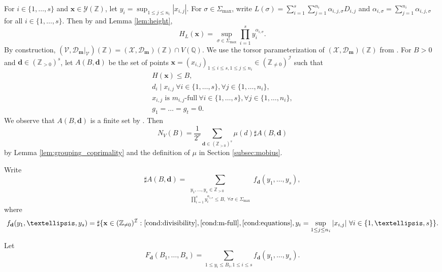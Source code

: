 \documentclass[10pt, a4paper, reqno, english]{amsart}
\newcommand\ZZ{\mathbb{Z}}
\newcommand\QQ{\mathbb{Q}}
\newcommand{\indexset}{{\mathcal I}} %
\theoremstyle{definition}
\numberwithin{theorem}{section}
\numberwithin{equation}{section}
\begin{document}
For $i\in\{1,\dots,s\}$ and $\mathbf x\in \mathscr Y(\ZZ)$, let $y_i=\sup_{1\leq j\leq n_{i}}|x_{i,j}|$. For $\sigma\in\Sigma_{\max}$, write $L(\sigma)=\sum_{i=1}^s\sum_{j=1}^{n_i}\alpha_{i,j,\sigma}D_{i,j}$ and $\alpha_{i,\sigma}=\sum_{j=1}^{n_i}\alpha_{i,j,\sigma}$ for all $i\in\{1,\dots,s\}$.
Then by \cite[Proposition 6.10]{hypmethod} and Lemma \ref{lem:height},
$$H_L(\mathbf x)=\sup_{\sigma\in \Sigma_{\max}}\prod_{i=1}^s y_i^{\alpha_{i,\sigma}}.$$
By construction, $\left(\mathscr V,\mathscr D_{\mathbf m}|_{\mathscr V}\right)(\ZZ)=\left(\mathscr X,\mathscr D_{\mathbf m}\right)(\ZZ)\cap V(\QQ)$. We use the torsor parameterization of $\left(\mathscr X,\mathscr D_{\mathbf m}\right)(\ZZ)$ from \cite[\S6.4]{hypmethod}.
For $B>0$ and $\mathbf d\in(\ZZ_{>0})^{s}$, 
	let $A(B,\mathbf d)$ be the set of points
	$\mathbf x=(x_{i,j})_{1\leq i\leq s,1\leq j\leq n_i}\in(\ZZ_{\neq0})^{\indexset}$ such that 
	\begin{gather}
	H(\mathbf x)\leq B, \label{cond:height}\\
	d_i\mid x_{i,j} \ \forall i\in\{1,\dots,s\}, \forall j\in\{1,\dots,n_i\}, \label{cond:divisibility}\\
	x_{i,j} \text{ is } m_{i,j}\text{-full} \ \forall i\in\{1,\dots,s\}, \forall j\in\{1,\dots,n_i\}, \label{cond:m-full}\\ 
	g_1=\dots=g_t=0.
	\label{cond:equations}
	\end{gather}	
	We observe that $A(B, \mathbf d)$ is a finite set by \cite[Lemma 6.11]{hypmethod}.	
	Then
	\begin{equation}
	\label{eq:moebius_inversion}
 	N_V(B)=\frac 1{2^r}\sum_{\mathbf d\in(\ZZ_{>0})^{s}}\mu(d)\sharp A(B, \mathbf d)
	\end{equation}
	by Lemma \ref{lem:grouping_coprimality} and the definition of $\mu$ in Section \ref{subsec:mobius}.

	
	Write
	$$
	\sharp A(B,\mathbf d)=\sum_{\substack{y_1,\dots,y_s\in\ZZ_{>0}
	\\ \prod_{i=1}^s y_i^{\alpha_{i,\sigma}}\leq B, \ \forall \sigma\in\Sigma_{\max}}}f_{\mathbf d}(y_1,\dots,y_s),
	$$
	where 
	\begin{align*}
	f_{\mathbf d}(y_1,\dots,y_s)=\sharp\{\mathbf x\in(\ZZ_{\neq 0})^{\indexset}: 
	\eqref{cond:divisibility},\eqref{cond:m-full},\eqref{cond:equations},
	y_i=\sup_{1\leq j\leq n_{i}}|x_{i,j}| \ \forall i\in\{1,\dots,s\} \}.
	\end{align*}

	 Let $$F_{\mathbf d}(B_1,\dots,B_s)=\sum_{1\leq y_i\leq B_i,1\leq i\leq s}f_{\mathbf d}(y_1,\dots,y_s).$$
\end{document}
